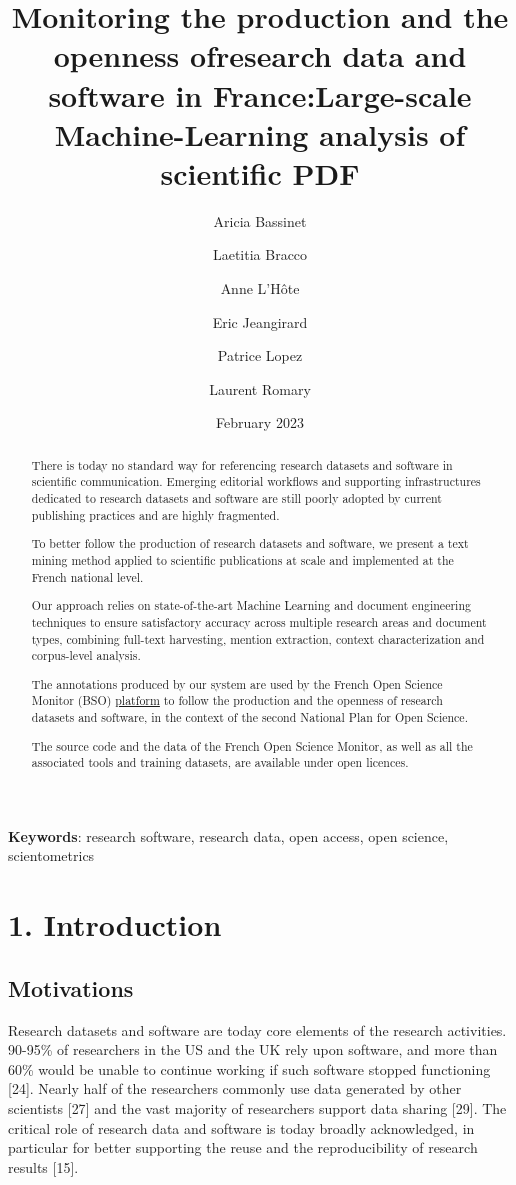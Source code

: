 \documentclass[
]{article}
\title{Monitoring the production and the openness of\newline research
data and software in France:\newline Large-scale Machine-Learning
analysis of scientific PDF}
\author[%
  2%
  ]{%
  Aricia Bassinet%
}
\author[%
  2%
  ]{%
  Laetitia Bracco%
}
\author[%
  1%
  ]{%
  Anne L'Hôte%
}
\author[%
  1%
  ]{%
  Eric Jeangirard%
}
\author[%
  3%
  ]{%
  Patrice Lopez%
}
\author[%
  4%
  ]{%
  Laurent Romary%
}
\affil[1]{French Ministry of Higher Education and Research, Paris,
France}
\affil[2]{University of Lorraine, France}
\affil[3]{science-miner, France}
\affil[4]{Inria, France}
\date{February 2023}
\begin{document}
\maketitle
\begin{abstract}
There is today no standard way for referencing research datasets and
software in scientific communication. Emerging editorial workflows and
supporting infrastructures dedicated to research datasets and software
are still poorly adopted by current publishing practices and are highly
fragmented.

To better follow the production of research datasets and software, we
present a text mining method applied to scientific publications at scale
and implemented at the French national level.

Our approach relies on state-of-the-art Machine Learning and document
engineering techniques to ensure satisfactory accuracy across multiple
research areas and document types, combining full-text harvesting,
mention extraction, context characterization and corpus-level analysis.

The annotations produced by our system are used by the French Open
Science Monitor (BSO)
\href{https://frenchopensciencemonitor.esr.gouv.fr}{platform} to follow
the production and the openness of research datasets and software, in
the context of the second National Plan for Open Science.

The source code and the data of the French Open Science Monitor, as well
as all the associated tools and training datasets, are available under
open licences.
\end{abstract}

\textbf{Keywords}: research software, research data, open access, open
science, scientometrics

\hypertarget{introduction}{%
\section{1. Introduction}\label{introduction}}

\hypertarget{motivations}{%
\subsection{Motivations}\label{motivations}}

Research datasets and software are today core elements of the research
activities. 90-95\% of researchers in the US and the UK rely upon
software, and more than 60\% would be unable to continue working if such
software stopped functioning {[}24{]}. Nearly half of the researchers
commonly use data generated by other scientists {[}27{]} and the vast
majority of researchers support data sharing {[}29{]}. The critical role
of research data and software is today broadly acknowledged, in
particular for better supporting the reuse and the reproducibility of
research results {[}15{]}.
\end{document}
